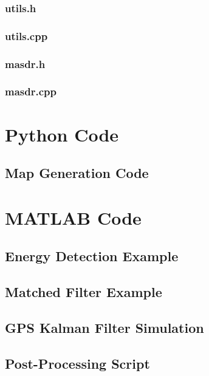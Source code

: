 \subsection{utils.h}

\subsection{utils.cpp}

\subsection{masdr.h}


\subsection{masdr.cpp}

\pagebreak

\chapter{Python Code}
\section{Map Generation Code}
\label{app:mapping_script}

\pagebreak
\pagebreak

\chapter{MATLAB Code}

\section{Energy Detection Example}
\label{app:energy_detection}

\pagebreak

\section{Matched Filter Example}
\label{app:matched_filter}

\pagebreak

\section{GPS Kalman Filter Simulation}
\label{app:kf_sim}

\pagebreak

\section{Post-Processing Script}
\label{app:matlab_proc}

\pagebreak

